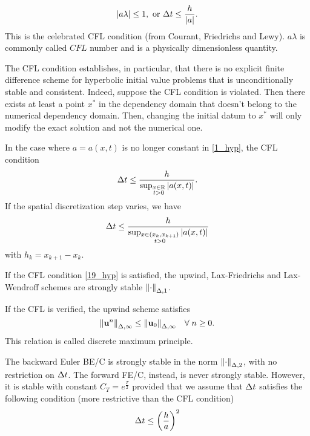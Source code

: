 \begin{equation}
    \abs{a\lambda} \leq 1, \text{ or } \Delta t \leq \frac{h}{\abs{a}}.
    \label{19_hyp}
\end{equation}
This is the celebrated CFL condition (from Courant, Friedrichs and Lewy). \(a\lambda\) is commonly called \(CFL\) number and is a physically dimensionless quantity.
\begin{remark}
    The CFL condition establishes, in particular, that there is no explicit finite difference scheme for hyperbolic initial value problems that is unconditionally stable and consistent. Indeed, suppose the CFL condition is violated. Then there exists at least a point \(x^*\) in the dependency domain that doesn't belong to the numerical dependency domain. Then, changing the initial datum to \(x^*\) will only modify the exact solution and not the numerical one.
\end{remark}
\begin{remark}
    In the case where \(a = a(x,t)\) is no longer constant in \eqref{1_hyp}, the CFL condition 
    \[
        \Delta t \leq \frac{h}{\sup_{\substack{x\in \mathbb{R} \\ t > 0}} \abs{a(x,t)}}.
    \]
    If the spatial discretization step varies, we have 
    \[
        \Delta t \leq \frac{h}{\sup_{\substack{x\in (x_k, x_{k+1}) \\ t > 0}} \abs{a(x,t)}}
    \]
    with \(h_k = x_{k+1} - x_k\).
\end{remark}
\begin{theorem}
    If the CFL condition \eqref{19_hyp} is satisfied, the upwind, Lax-Friedrichs and Lax-Wendroff schemes are strongly stable \(\norm{\cdot}_{\Delta,1}\).
\end{theorem}
\begin{theorem}
    If the CFL is verified, the upwind scheme satisfies
    \begin{equation}
        \norm{\textbf{u}^n}_{\Delta, \infty} \leq \norm{\textbf{u}_0}_{\Delta, \infty} \quad \forall \; n \geq 0.
        \label{20_hyp}
    \end{equation}
    This relation is called discrete maximum principle.
\end{theorem}
\begin{theorem}
    The backward Euler BE/C is strongly stable in the norm \(\norm{\cdot}_{\Delta, 2}\), with no restriction on \(\Delta t\). The forward FE/C, instead, is never strongly stable. However, it is stable with constant \(C_T = e^{\frac{T}{2}}\) provided that we assume that \(\Delta t\) satisfies the following condition (more restrictive than the CFL condition)
    \begin{equation}
        \Delta t \leq \left( \frac{h}{a} \right)^2
        \label{21_hyp}
    \end{equation}  
\end{theorem}

